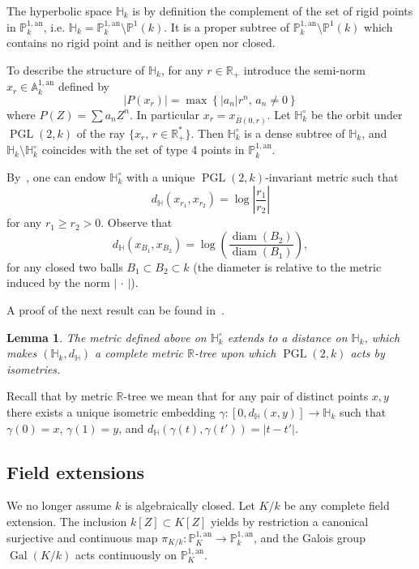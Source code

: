 \documentclass[11pt]{article}
\newtheorem{lemm}[theo]{Lemma}
\theoremstyle{definition}
\numberwithin{equation}{section}
\numberwithin{figure}{section}
\numberwithin{table}{section}
\DeclareMathOperator{\Gal}{Gal}
\DeclareMathOperator{\diam}{diam}
\DeclareMathOperator{\PGL}{PGL}
\newcommand{\hh}{\mathbb{H}}
\newcommand{\A}{{\mathbb A}}
\newcommand{\R}{{\mathbb R}}
\newcommand{\an}{\mathrm{an}}
\newcommand{\PP}{\mathbb{P}}
\newcommand{\PGLk}{\PGL(2, k)}
\begin{document}
The hyperbolic space $\hh_k$ is by definition the complement of the set of rigid points in $\PP^{1,\an}_k$, i.e. $\hh_k = \PP^{1,\an}_k \setminus \PP^{1}(k)$. It is a proper subtree of $\PP^{1,\an}_k \setminus \PP^1(k)$ which contains no rigid point and is neither open nor closed.

To describe the structure of $\hh_k$, for any $r\in \R_+$ introduce the semi-norm $x_r\in \A^{1,\an}_k$ defined by
\[
|P(x_r)| = \max \left\{ |a_n| r^n, \, a_n \neq 0 \right\}
\]
where $P(Z) = \sum a_n Z^n$. In particular $x_r = x_{\bar B(0,r)}$. Let $\hh_k^\circ$ be the orbit under $\PGL(2,k)$ of the ray $\{ x_r, \, r\in \R_+^*\}$. Then $\hh_k^\circ$ is a dense subtree of $\hh_k$, and $\hh_k \setminus \hh_k^\circ$ coincides with the set of type 4 points in $\PP^{1,\an}_k$.

By~\cite[Prop.~2.30]{baker-rumely}, one can endow $\hh_k^\circ$ with a unique $\PGL(2,k)$-invariant metric such that
\[
d_{\hh} (x_{r_1}, x_{r_2}) = \log \left|\frac{r_1}{r_2}\right|
\]
for any $r_1\ge r_2 >0$. Observe that
\[
d_{\hh} (x_{B_1}, x_{B_2}) = \log \left(\frac{\diam(B_2)}{\diam(B_1)}\right),
\]
for any closed two balls $B_1 \subset B_2 \subset k$ (the diameter is relative to the metric induced by the norm $|{\,\cdot\,}|$).

A proof of the next result can be found in~\cite[Prop.~2.29]{baker-rumely}.

\begin{lemm}
The metric defined above on $\hh_k^\circ$ extends to a distance on $\hh_k$, which makes $(\hh_k, d_{\hh})$ a complete metric $\R$-tree upon which $\PGLk$ acts by isometries.
\end{lemm}

Recall that by metric $\R$-tree we mean that for any pair of distinct points $x,y$ there exists a unique isometric embedding $\gamma : [0,d_{\hh}(x,y)] \to \hh_k$ such that $\gamma(0) = x$, $\gamma(1) =y$, and $d_{\hh}(\gamma(t), \gamma(t')) = |t -t'|$.

\subsection{Field extensions}\label{subs:field extensions}

We no longer assume $k$ is algebraically closed. Let $K/k$ be any complete field extension. The inclusion $k[Z] \subset K[Z]$ yields by restriction a canonical surjective and continuous map $\pi_{K/k}\colon \PP^{1,\an}_K \to \PP^{1,\an}_k$, and the Galois group $\Gal(K/k)$ acts continuously on $\PP^{1,\an}_K$.
\end{document}
